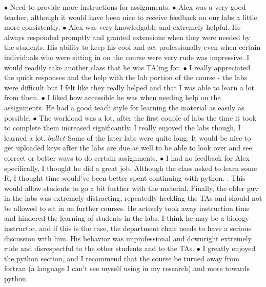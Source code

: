 \documentclass[11pt]{labbook}
\begin{document}
$\bullet$ Need to provide more instructions for assignments.\newline
$\bullet$ Alex was a very good teacher, although it would have been nice to receive feedback on our labs a little more consistently. \newline
$\bullet$ Alex was very knowledgable and extremely helpful. He always responded promptly and granted extensions when they were needed by the students. His ability to keep his cool and act professionally even when certain individuals who were sitting in on the course were very rude was impressive. I would readily take another class that he was TA'ing for. \newline
$\bullet$ I really appreciated the quick responses and the help with the lab portion of the course - the labs were difficult but I felt like they really helped and that I was able to learn a lot from them. \newline
$\bullet$ I liked how accessible he was when needing help on the assignments. He had a good teach style for learning the material as easily as possible. \newline
$\bullet$ The workload was a lot, after the first couple of labs the time it took to complete them increased significantly. I really enjoyed the labs though, I learned a lot. \newline
$bullet$ Some of the later labs were quite long. It would be nice to get uploaded keys after the labs are due as well to be able to look over and see correct or better ways to do certain assignments. \newline
$\bullet$ I had no feedback for Alex specifically, I thought he did a great job. Although the class asked to learn some R, I thought time would've been better spent continuing with python. . This would allow students to go a bit further with the material. Finally, the older guy in the labs was extremely distracting, repeatedly heckling the TAs and should not be allowed to sit in on further courses. He actively took away instruction time and hindered the learning of students in the labs. I think he may be a biology instructor, and if this is the case, the department chair needs to have a serious discussion with him. His behavior was unprofessional and downright extremely rude and disrespectful to the other students and to the TAs. \newline
$\bullet$ I greatly enjoyed the python section, and I recommend that the course be turned away from fortran (a language I can't see myself using in my research) and more towards python. \newline
\end{document}
